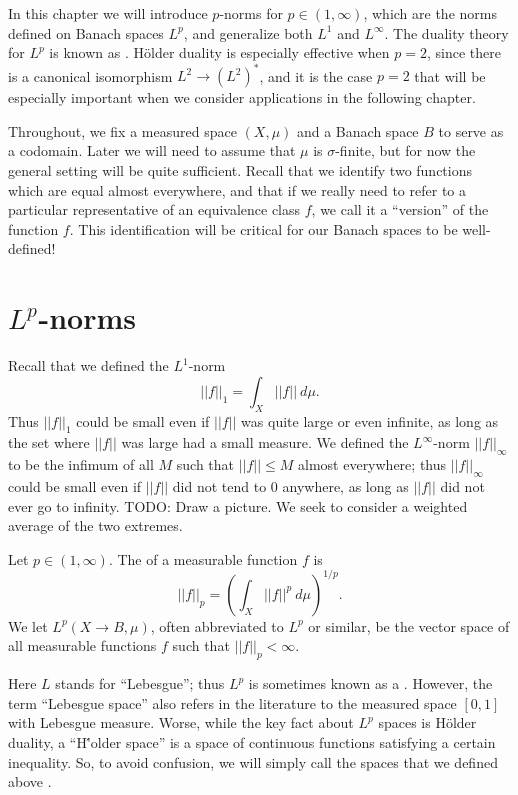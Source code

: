 In this chapter we will introduce $p$-norms for $p \in (1, \infty)$, which are the norms defined on Banach spaces $L^p$, and generalize both $L^1$ and $L^\infty$.
The duality theory for $L^p$ is known as .
H\"older duality is especially effective when $p = 2$, since there is a canonical isomorphism $L^2 \to (L^2)^*$, and it is the case $p = 2$ that will be especially important when we consider applications in the following chapter.

Throughout, we fix a measured space $(X, \mu)$ and a Banach space $B$ to serve as a codomain.
Later we will need to assume that $\mu$ is $\sigma$-finite, but for now the general setting will be quite sufficient.
Recall that we identify two functions which are equal almost everywhere, and that if we really need to refer to a particular representative of an equivalence class $f$, we call it a ``version'' of the function $f$.
This identification will be critical for our Banach spaces to be well-defined!

\section{$L^p$-norms}
Recall that we defined the $L^1$-norm
\[||f||_1 = \int_{X} ||f||~d\mu.\]
Thus $||f||_1$ could be small even if $||f||$ was quite large or even infinite, as long as the set where $||f||$ was large had a small measure.
We defined the $L^\infty$-norm $||f||_\infty$ to be the infimum of all $M$ such that $||f|| \leq M$ almost everywhere; thus $||f||_\infty$ could be small even if $||f||$ did not tend to $0$ anywhere, as long as $||f||$ did not ever go to infinity.
TODO: Draw a picture.
We seek to consider a weighted average of the two extremes.

\begin{definition}
Let $p \in (1, \infty)$.
The  of a measurable function $f$ is
\begin{equation}
\label{Lp definition}
||f||_{p}  = \left(\int_{X} ||f||^{p} ~d\mu\right)^{1/p}.
\end{equation}
We let $L^p(X \to B, \mu)$, often abbreviated to $L^p$ or similar, be the vector space of all measurable functions $f$ such that $||f||_{p}  < \infty$.
\end{definition}

Here $L$ stands for ``Lebesgue''; thus $L^p$ is sometimes known as a .
However, the term ``Lebesgue space'' also refers in the literature to the measured space $[0, 1]$ with Lebesgue measure.
Worse, while the key fact about $L^p$ spaces is H\"older duality, a ``H\''older space'' is a space of continuous functions satisfying a certain inequality.
So, to avoid confusion, we will simply call the spaces that we defined above .

